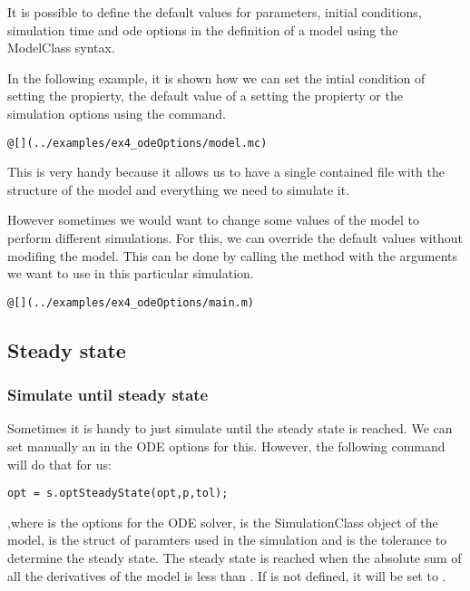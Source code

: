 \documentclass[11pt]{article}
\begin{document}
It is possible to define the default values for parameters, initial conditions, simulation time and ode options in the definition of a model using the ModelClass syntax.

In the following example, it is shown how we can set the intial condition of  setting the  propierty, the default value of a  setting the  propierty or the simulation options using the  command.

\begin{lstlisting}
@[](../examples/ex4_odeOptions/model.mc)
\end{lstlisting}

This is very handy because it allows us to have a single contained file with the structure of the model and everything we need to simulate it.

However sometimes we would want to change some values of the model to perform different simulations.
For this, we can override the default values without modifing the model. This can be done by calling the  method with the arguments we want to use in this particular simulation.

\begin{lstlisting}
@[](../examples/ex4_odeOptions/main.m)
\end{lstlisting}

\subsection{Steady state}

\subsubsection{Simulate until steady state}

Sometimes it is handy to just simulate until the steady state is reached. We can set manually an  in the ODE options for this. However, the following command will do that for us:

\begin{lstlisting}
opt = s.optSteadyState(opt,p,tol);
\end{lstlisting}

,where  is the options for the ODE solver,  is the SimulationClass object of the model,  is the struct of paramters used in the simulation and  is the tolerance to determine the steady state. The steady state is reached when the absolute sum of all the derivatives of the model is less than . If  is not defined, it will be set to .
\end{document}
